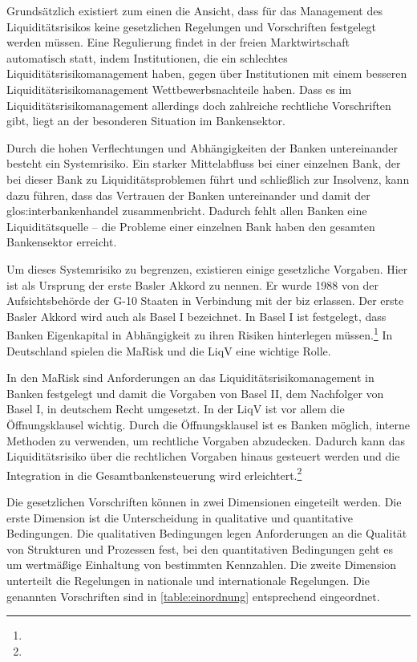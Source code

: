 \begin{onehalfspacing}
Grundsätzlich existiert zum einen die Ansicht, dass für das Management des Liquiditätsrisikos keine gesetzlichen Regelungen und Vorschriften festgelegt werden müssen. Eine Regulierung findet in der freien Marktwirtschaft automatisch statt, indem Institutionen, die ein schlechtes Liquiditätsrisikomanagement haben, gegen über Institutionen mit einem besseren Liquiditätsrisikomanagement Wettbewerbsnachteile haben. Dass es im Liquiditätsrisikomanagement allerdings doch zahlreiche rechtliche Vorschriften gibt, liegt an der besonderen Situation im Bankensektor.

Durch die hohen Verflechtungen und Abhängigkeiten der Banken untereinander besteht ein Systemrisiko. Ein starker Mittelabfluss bei einer einzelnen Bank, der bei dieser Bank zu Liquiditätsproblemen führt und schließlich zur Insolvenz, kann dazu führen, dass das Vertrauen der Banken untereinander und damit der \gls{glos:interbankenhandel} zusammenbricht. Dadurch fehlt allen Banken eine Liquiditätsquelle -- die Probleme einer einzelnen Bank haben den gesamten Bankensektor erreicht.

Um dieses Systemrisiko zu begrenzen, existieren einige gesetzliche Vorgaben. Hier ist als Ursprung der erste Basler Akkord zu nennen. Er wurde 1988 von der Aufsichtsbehörde der G-10 Staaten in Verbindung mit der \gls{biz} erlassen. Der erste Basler Akkord wird auch als Basel I bezeichnet. In Basel I ist festgelegt, dass Banken Eigenkapital in Abhängigkeit zu ihren Risiken hinterlegen müssen.\footnote{ } In Deutschland spielen die \gls{MaRisk} und die \gls{LiqV} eine wichtige Rolle.

In den \gls{MaRisk} sind Anforderungen an das Liquiditätsrisikomanagement in Banken festgelegt und damit die Vorgaben von Basel II, dem Nachfolger von Basel I, in deutschem Recht umgesetzt. In der \gls{LiqV} ist vor allem die Öffnungsklausel wichtig. Durch die Öffnungsklausel ist es Banken möglich, interne Methoden zu verwenden, um rechtliche Vorgaben abzudecken. Dadurch kann das Liquiditätsrisiko über die rechtlichen Vorgaben hinaus gesteuert werden und die Integration in die Gesamtbankensteuerung wird erleichtert.\footnote{ }

Die gesetzlichen Vorschriften können in zwei Dimensionen eingeteilt werden. Die erste Dimension ist die Unterscheidung in qualitative und quantitative Bedingungen. Die qualitativen Bedingungen legen Anforderungen an die Qualität von Strukturen und Prozessen fest, bei den quantitativen Bedingungen geht es um wertmäßige Einhaltung von bestimmten Kennzahlen. Die zweite Dimension unterteilt die Regelungen in nationale und internationale Regelungen. Die genannten Vorschriften sind in \vref{table:einordnung} entsprechend eingeordnet.


\end{onehalfspacing}
